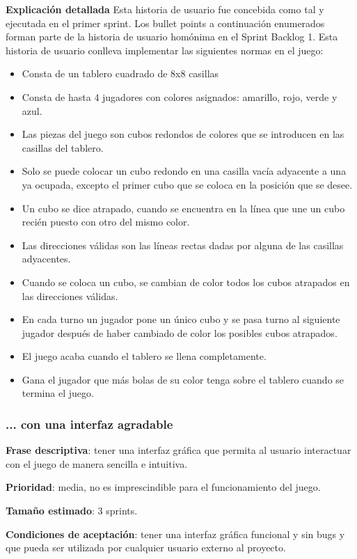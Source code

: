 \documentclass[../../FINAL/Scrum/SCRUM.tex]{subfiles}
\begin{document}
\textbf{Explicación detallada}
Esta historia de usuario fue concebida como tal y ejecutada en el primer sprint. Los  bullet points a continuación enumerados forman parte de la historia de usuario homónima en el Sprint Backlog 1.
Esta historia de usuario conlleva implementar las siguientes normas en el juego:
\begin{itemize}
\item Consta de un tablero cuadrado de 8x8 casillas
\item Consta de hasta 4 jugadores con colores asignados: amarillo, rojo, verde y azul.
\item Las piezas del juego son cubos redondos de colores que se introducen en las casillas del tablero.
\item Solo se puede colocar un cubo redondo en una casilla vacía adyacente a una ya ocupada, excepto el primer cubo que se coloca en la posición que se desee.
\item Un cubo se dice atrapado, cuando se encuentra en la línea que une un cubo recién puesto con otro del mismo color.
\item Las direcciones válidas son las líneas rectas dadas por alguna de las casillas adyacentes.
\item Cuando se coloca un cubo, se cambian de color todos los cubos atrapados en las direcciones válidas.
\item En cada turno un jugador pone un único cubo y se pasa turno al siguiente jugador después de haber cambiado de color los posibles cubos atrapados.
\item El juego acaba cuando el tablero se llena completamente.
\item Gana el jugador que más bolas de su color tenga sobre el tablero cuando se termina el juego.
\end{itemize}

\subsubsection{... con una interfaz agradable}
\textbf{Frase descriptiva}: tener una interfaz gráfica que permita al usuario interactuar con el juego de manera sencilla e intuitiva.

\textbf{Prioridad}: media, no es imprescindible para el funcionamiento del juego.

\textbf{Tamaño estimado}: 3 sprints.

\textbf{Condiciones de aceptación}: tener una interfaz gráfica funcional y sin bugs y que pueda ser utilizada por cualquier usuario externo al proyecto.
\end{document}
